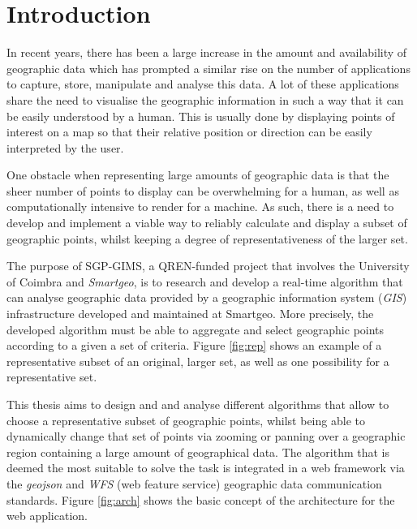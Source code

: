 \pagestyle{mypagestyle}

\setcounter{page}{1}

\cleardoublepage
\chapter{Introduction}
\label{chap:intro}

In recent years, there has been a large increase in the amount and availability of geographic data which has prompted a similar rise on the number of applications to capture, store, manipulate and analyse this data.
A lot of these applications share the need to visualise the geographic information in such a way that it can be easily understood by a human.
This is usually done by displaying points of interest on a map so that their relative position or direction can be easily interpreted by the user.

One obstacle when representing large amounts of geographic data is that the sheer number of points to display can be overwhelming for a human, as well as computationally intensive to render for a machine. As such, there is a need to develop and implement a viable way to reliably calculate and display a subset of geographic points, whilst keeping a degree of representativeness of the larger set.



The purpose of SGP-GIMS, a QREN-funded project that involves the University of Coimbra and \emph{Smartgeo}, is to research and develop a real-time algorithm that can analyse geographic data provided by a geographic information system (\emph{GIS}) infrastructure developed and maintained at Smartgeo. More precisely, the developed algorithm must be able to aggregate and select geographic points according to a given a set of criteria. Figure \ref{fig:rep} shows an example of a representative subset of an original, larger set, as well as one possibility for a representative set.

This thesis aims to design and and analyse different algorithms that allow to choose a representative subset of geographic points, whilst being able to dynamically change that set of points via zooming or panning over a geographic region containing a large amount of geographical data. 
The algorithm that is deemed the most suitable to solve the task is integrated in a web framework via the \emph{geojson} and \emph{WFS} (web feature service) geographic data communication standards. Figure \ref{fig:arch} shows the basic concept of the architecture for the web application.


